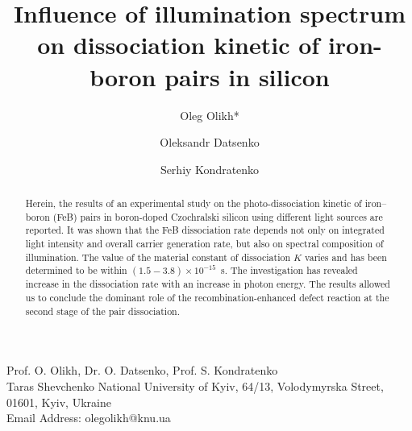 \documentclass{WileyMSP-template}
\begin{document}
\pagestyle{fancy}


\title{Influence of illumination spectrum on dissociation kinetic of iron-boron pairs in silicon}

\maketitle




\author{Oleg Olikh*}
\author{Oleksandr Datsenko}
\author{Serhiy Kondratenko}


\dedication{}






\begin{affiliations}
Prof. O. Olikh, Dr. O. Datsenko, Prof. S. Kondratenko\\
Taras Shevchenko National University of Kyiv, 64/13, Volodymyrska Street, 01601, Kyiv, Ukraine\\
Email Address: olegolikh@knu.ua


\end{affiliations}






\begin{abstract}

Herein, the results of an experimental study on the photo-dissociation kinetic of iron–boron (FeB) pairs
in boron-doped Czochralski silicon using different light sources are reported.
It was shown that the FeB dissociation rate depends not only on integrated light intensity
and overall carrier generation rate, but also on spectral composition of illumination.
The value of the material constant of dissociation $K$ varies and has been determined to be within $(1.5-3.8)\times10^{-15}$~s.
The investigation has revealed  increase in the dissociation rate with an increase in photon energy.
The results allowed us to conclude the dominant role of the recombination-enhanced defect reaction
at the second stage of the pair dissociation.

\end{abstract}
\end{document}
